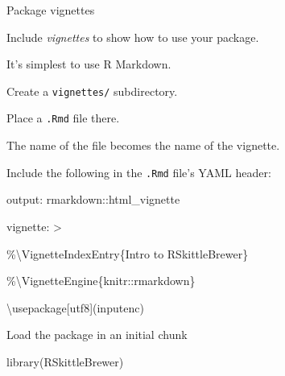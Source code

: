 \documentclass[12pt,t]{beamer}
\begin{document}
\begin{frame}{Package vignettes}

\bbi
\item Include \emph{vignettes\/} to show how to use your package.
\item It's simplest to use R Markdown.
  \bi
  \item Create a {\tt vignettes/} subdirectory.
  \item Place a {\tt .Rmd} file there.
  \item The name of the file becomes the name of the vignette.
  \ei
\item Include the following in the {\tt .Rmd} file's YAML header:
  \bi
  \item[] {\lolit \ttfn output: rmarkdown::html\_vignette}
  \item[] {\lolit \ttfn vignette: >}
  \item[] {\lolit \ttfn \hspace{2em} \%{\textbackslash}VignetteIndexEntry\{Intro to RSkittleBrewer\}}
  \item[] {\lolit \ttfn \hspace{2em} \%{\textbackslash}VignetteEngine\{knitr::rmarkdown\}}
  \item[] {\lolit \ttfn \hspace{2em} {\textbackslash}usepackage[utf8](inputenc)}
  \ei

\item Load the package in an initial chunk

  \bi
  \item[] {\lolit \ttfn library(RSkittleBrewer)}
  \ei

\ei

\end{frame}
\end{document}
